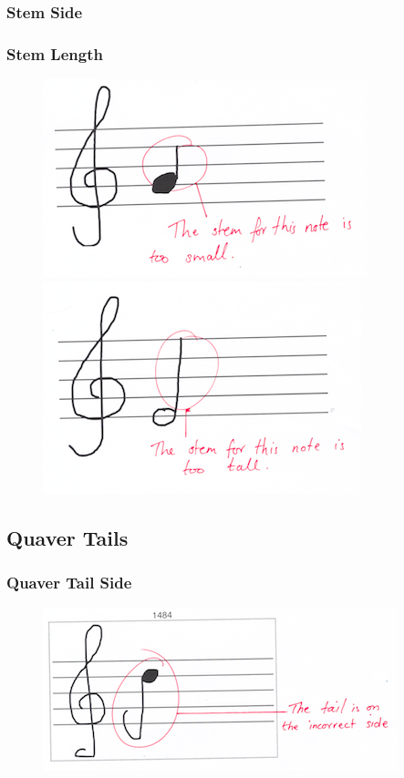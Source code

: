 \subsubsection{Stem Side}\label{sec:tf-stem-side}

\subsubsection{Stem Length}\label{sec:tf-stem-length}

\begin{figure}[H]
  \centering
  \includegraphics[width=.4\linewidth]{gfx/teacher-notes/mistake-stem-too-short}
  \includegraphics[width=.4\linewidth]{gfx/teacher-notes/mistake-stem-too-long}
  \caption{}
\end{figure}

\subsection{Quaver Tails}

\subsubsection{Quaver Tail Side}\label{sec:tf-quaver-tail-side}

\begin{figure}[H]
  \centering
  \includegraphics[width=.6\linewidth]{gfx/teacher-notes/mistake-quaver-tail-wrong-side.png}
  \caption{}
\end{figure}

